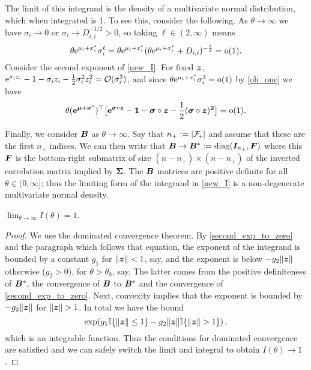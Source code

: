 The limit of this integrand is the density of a multivariate normal
distribution, which when integrated is 1. To see this, consider the
following. As $\theta \to \infty$ we have $\sigma_i \to 0$ or $\sigma_i
\to D_{i,i}^{-1/2} > 0$, so taking $\ell \in (2,\infty)$ means
\begin{equation} \label{oh_one}
	\theta \mathrm{e}^{\mu_i + x_i^*} \sigma_i^\ell = \theta \mathrm{e}^{\mu_i + x_i^*}
  (\theta \mathrm{e}^{\mu_i + x_i^*} + D_{i,i})^{-\frac{\ell}{2}} = {\mathrm{o}}(1) .
\end{equation}
Consider the second exponent of \eqref{new_I}. For fixed $\bm{z}$,
$\mathrm{e}^{\sigma_i z_i} - 1 - \sigma_i z_i - \frac12 \sigma_i^2 z_i^2 =
{\mathcal{O}}(\sigma_i^3)$, and since $\theta \mathrm{e}^{\mu_i + x_i^*} \sigma_i^3 = {\mathrm{o}}(1)$
by \eqref{oh_one} we have
\begin{equation} \label{second_exp_to_zero}
	\theta (\text{\bf{e}}^{\bm{\mu} + \bm{x}^*})^\top  \bigl[ \text{\bf{e}}^{\bm{\sigma} \circ \bm{z}} - \bm{1} - \bm{\sigma} \circ \bm{z} - \frac12(\bm{\sigma} \circ \bm{z})^{\bm{2}} \bigr] = {\mathrm{o}}(1) .
\end{equation}

Finally, we consider $\bm{B}$ as $\theta \to \infty$. Say that $n_{+} \defeq
\abs{\Fset{+}}$ and assume that these are the first $n_{+}$ indices. We can then
write that $\bm{B} \to \bm{B}^* := \mathrm{diag}(\bm{I}_{n_{+}}, \bm{F})$ where this
$\bm{F}$ is the bottom-right submatrix of size $(n-n_{+}) \times (n-n_{+})$ of
the inverted correlation matrix implied by $\bm{\Sigma}$. The $\bm{B}$ matrices are
positive definite for all $\theta\in(0,\infty]$; thus the limiting form of the
  integrand in \eqref{new_I} is a non-degenerate multivariate normal density.

\begin{proposition} $\lim_{\theta \to \infty} I(\theta) = 1$.
\end{proposition}

\begin{proof}
We use the dominated convergence theorem. By \eqref{second_exp_to_zero} and
the paragraph which follows that equation, the exponent of the integrand is
bounded by a constant $g_1$ for $\lVert \bm{z}\rVert < 1$, say, and the exponent is
below $-g_2 \lVert \bm{z}\rVert$ otherwise ($g_2 > 0$), for $\theta > \theta_0$, say. The
latter comes from the positive definiteness of $\bm{B}^*$, the convergence of
$\bm{B}$ to $\bm{B}^*$ and the convergence of \eqref{second_exp_to_zero}. Next,
convexity implies that the exponent is bounded by $-g_2\lVert \bm{z}\rVert$ for $\lVert \bm{z}\rVert
> 1$. In total we have the bound
\[ \exp( g_1 \mathbb{I}\{ \lVert \bm{z}\rVert \leq 1 \} - g_2 \lVert \bm{z}\rVert \mathbb{I}\{ \lVert \bm{z}\rVert > 1 \} ) \,, \]
which is an integrable function. Thus the conditions for dominated convergence
are satisfied and we can safely switch the limit and integral to obtain
$I(\theta) \to 1$.
\end{proof}

